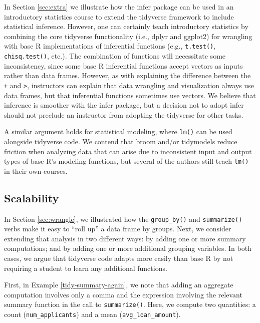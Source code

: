 \documentclass[12pt]{article}
\begin{document}
In Section \ref{sec:extra} we illustrate how the infer package can be
used in an introductory statistics course to extend the tidyverse
framework to include statistical inference. However, one can certainly
teach introductory statistics by combining the core tidyverse
functionality (i.e., dplyr and ggplot2) for wrangling with base R
implementations of inferential functions (e.g., \texttt{t.test()},
\texttt{chisq.test()}, etc.). The combination of functions will
necessitate some inconsistency, since some base R inferential functions
accept vectors as inputs rather than data frames. However, as with
explaining the difference between the \texttt{+} and
\texttt{\textbar{}\textgreater{}}, instructors can explain that data
wrangling and visualization always use data frames, but that inferential
functions sometimes use vectors. We believe that inference is smoother
with the infer package, but a decision not to adopt infer should not
preclude an instructor from adopting the tidyverse for other tasks.

A similar argument holds for statistical modeling, where \texttt{lm()}
can be used alongside tidyverse code. We contend that broom and/or
tidymodels reduce friction when analyzing data that can arise due to
inconsistent input and output types of base R's modeling functions, but
several of the authors still teach \texttt{lm()} in their own courses.

\hypertarget{sec:scalability}{%
\subsection{Scalability}\label{sec:scalability}}

In Section \ref{sec:wrangle}, we illustrated how the
\texttt{group\_by()} and \texttt{summarize()} verbs make it easy to
``roll up'' a data frame by groups. Next, we consider extending that
analysis in two different ways: by adding one or more summary
computations; and by adding one or more additional grouping variables.
In both cases, we argue that tidyverse code adapts more easily than base
R by not requiring a student to learn any additional functions.

First, in Example \ref{tidy-summary-again}, we note that adding an
aggregate computation involves only a comma and the expression involving
the relevant summary function in the call to \texttt{summarize()}. Here,
we compute two quantities: a count (\texttt{num\_applicants}) and a mean
(\texttt{avg\_loan\_amount}).

\linespread{1}
\end{document}
